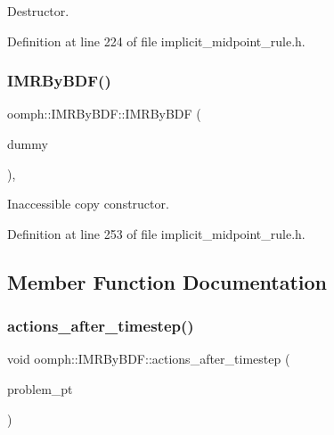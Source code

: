 Destructor. 



Definition at line 224 of file implicit\+\_\+midpoint\+\_\+rule.\+h.

\mbox{\label{classoomph_1_1IMRByBDF_a736422b80df5286da0a56301da073b16}} 
\subsubsection{\texorpdfstring{I\+M\+R\+By\+B\+D\+F()}{IMRByBDF()}\hspace{0.1cm}{\footnotesize\ttfamily [2/2]}}
{\footnotesize\ttfamily oomph\+::\+I\+M\+R\+By\+B\+D\+F\+::\+I\+M\+R\+By\+B\+DF (\begin{DoxyParamCaption}\item[{const \hyperlink{classoomph_1_1IMRByBDF}{I\+M\+R\+By\+B\+DF} \&}]{dummy }\end{DoxyParamCaption})\hspace{0.3cm}{\ttfamily [inline]}, {\ttfamily [private]}}



Inaccessible copy constructor. 



Definition at line 253 of file implicit\+\_\+midpoint\+\_\+rule.\+h.



\subsection{Member Function Documentation}
\mbox{\label{classoomph_1_1IMRByBDF_a1eb1b47643bf37e27c478c6987c7716d}} 
\subsubsection{\texorpdfstring{actions\+\_\+after\+\_\+timestep()}{actions\_after\_timestep()}}
{\footnotesize\ttfamily void oomph\+::\+I\+M\+R\+By\+B\+D\+F\+::actions\+\_\+after\+\_\+timestep (\begin{DoxyParamCaption}\item[{\hyperlink{classoomph_1_1Problem}{Problem} $\ast$}]{problem\+\_\+pt }\end{DoxyParamCaption})\hspace{0.3cm}{\ttfamily [virtual]}}

